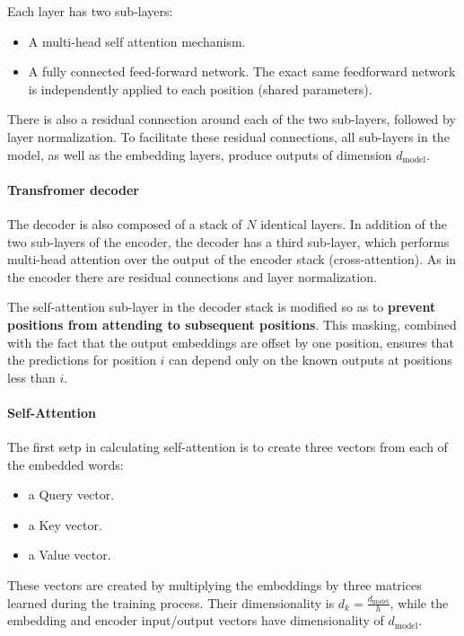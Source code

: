 Each layer has two sub-layers:
\begin{itemize}
  \item A multi-head self attention mechanism.
  \item A fully connected feed-forward network. The exact same feedforward network is independently applied to each position (shared parameters).
\end{itemize}

There is also a residual connection around each of the two sub-layers, followed by layer normalization.
To facilitate these residual connections, all sub-layers in the model, as well as the embedding layers, produce outputs of dimension $d_{\text{model}}$.

\paragraph{Transfromer decoder}
The decoder is also composed of a stack of $N$ identical layers.
In addition of the two sub-layers of the encoder, the decoder has a third sub-layer, which performs multi-head attention over the output of the encoder stack (cross-attention).
As in the encoder there are residual connections and layer normalization.

The self-attention sub-layer in the decoder stack is modified so as to \textbf{prevent positions from attending to subsequent positions}.
This masking, combined with the fact that the output embeddings are offset by one position, ensures that the predictions for position $i$ can depend only on the known outputs at positions less than $i$.

\paragraph{Self-Attention}
The first setp in calculating self-attention is to create three vectors from each of the embedded words:
\begin{itemize}
  \item a Query vector.
  \item a Key vector.
  \item a Value vector.
\end{itemize}

These vectors are created by multiplying the embeddings by three matrices learned during the training process.
Their dimensionality is $d_k = \frac{d_{\text{model}}}{h}$, while the embedding and encoder input/output vectors have dimensionality of $d_{\text{model}}$.

